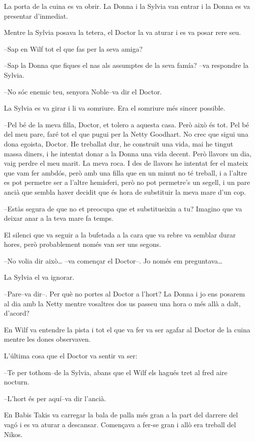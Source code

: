 La porta de la cuina es va obrir. La Donna i la Sylvia van entrar i la
Donna es va presentar d'inmediat.

Mentre la Sylvia posava la tetera, el Doctor la va aturar i es va posar
rere seu.

--Sap en Wilf tot el que fas per la seva amiga?

--Sap la Donna que fiques el nas als assumptes de la seva famía? --va
respondre la Sylvia.

--No sóc enemic teu, senyora Noble--va dir el Doctor.

La Sylvia es va girar i li va somriure. Era el somriure més sincer
possible.

--Pel bé de la meva filla, Doctor, et tolero a aquesta casa. Però això
és tot. Pel bé del meu pare, faré tot el que pugui per la Netty
Goodhart. No crec que sigui una dona egoista, Doctor. He treballat dur,
he construït una vida, mai he tingut massa diners, i he intentat donar a
la Donna una vida decent. Però llavors un dia, vaig perdre el meu marit.
La meva roca. I des de llavors he intentat fer el mateix que vam fer
ambdós, però amb una filla que en un minut no té treball, i a l'altre es
pot permetre ser a l'altre hemisferi, però no pot permetre's un segell,
i un pare ancià que sembla haver decidit que és hora de substituir la
meva mare d'un cop.

--Estàs segura de que no et preocupa que et substitueixin a tu? Imagino
que va deixar anar a la teva mare fa temps.

El silenci que va seguir a la bufetada a la cara que va rebre va semblar
durar hores, però probablement només van ser uns segons.

--No volia dir això\ldots{} --va començar el Doctor--. Jo només em
preguntava\ldots{}

La Sylvia el va ignorar.

--Pare--va dir--. Per què no portes al Doctor a l'hort? La Donna i jo
ens posarem al dia amb la Netty mentre vosaltres dos us passeu una hora
o més allà a dalt, d'acord?

En Wilf va entendre la pista i tot el que va fer va ser agafar al Doctor
de la cuina mentre les dones observaven.

L'última cosa que el Doctor va sentir va ser:

--Te per tothom--de la Sylvia, abans que el Wilf els hagués tret al fred
aire nocturn.

--L'hort és per aquí--va dir l'ancià.

En Babis Takis va carregar la bala de palla més gran a la part del
darrere del vagó i es va aturar a descansar. Començava a fer-se gran i
allò era treball del Nikos.


